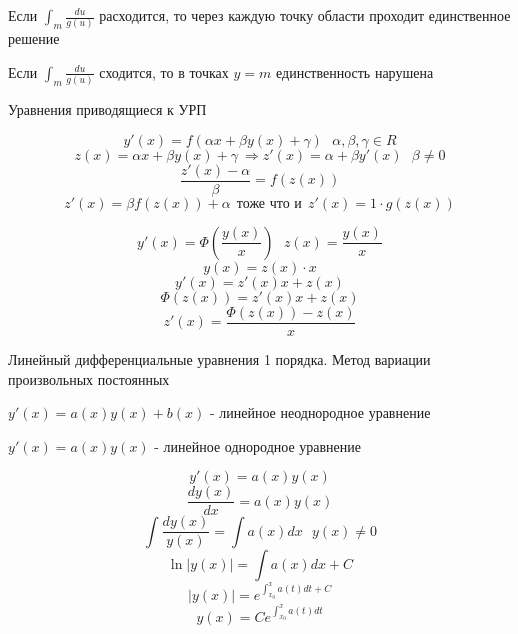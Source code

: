 \begin{theorem}
  Если $\int_m \frac{du}{g(u)}$ расходится, то через каждую точку области
  проходит единственное решение

  Если $\int_m \frac{du}{g(u)}$ сходится, то в точках $y = m$ единственность
  нарушена
\end{theorem}

\begin{title}[\Large]
  Уравнения приводящиеся к УРП
\end{title}

\begin{block}
  $$
  y'(x) = f(\alpha x + \beta y(x) + \gamma) ~~~ \alpha, \beta, \gamma \in R
  $$
  $$
  z(x) = \alpha x + \beta y(x) + \gamma ~ \Rightarrow z'(x) = \alpha +
  \beta y'(x) ~~~ \beta \not= 0
  $$
  $$
  \frac{z'(x) - \alpha}{\beta} = f(z(x))
  $$
  $$
  z'(x) = \beta f(z(x)) + \alpha ~~ \text{тоже что и} ~~
  z'(x) = 1 \cdot g(z(x))
  $$
\end{block}

\begin{block}
  $$
  y'(x) = \Phi \left( \frac{y(x)}{x} \right) ~~~ z(x) = \frac{y(x)}{x}
  $$
  $$
  y(x) = z(x) \cdot x
  $$
  $$
  y'(x) = z'(x) x + z(x)
  $$
  $$
  \Phi(z(x)) = z'(x)x + z(x)
  $$
  $$
  z'(x) = \frac{\Phi(z(x)) - z(x)}{x}
  $$
\end{block}

\begin{title}[\Large]
  Линейный дифференциальные уравнения 1 порядка. Метод вариации произвольных
  постоянных
\end{title}

\begin{define}
  $y'(x) = a(x)y(x) + b(x)$ - линейное неоднородное уравнение

  $y'(x) = a(x)y(x)$ - линейное однородное уравнение
\end{define}

\begin{block}
  $$
  y'(x) = a(x)y(x)
  $$
  $$
  \frac{dy(x)}{dx} = a(x)y(x)
  $$
  $$
  \int \frac{dy(x)}{y(x)} = \int a(x)dx ~~~ y(x) \not= 0
  $$
  $$
  \ln |y(x)| = \int a(x)dx + C
  $$
  $$
  |y(x)| = e^{\int_{x_0}^x a(t) dt + C}
  $$
  $$
  y(x) = C e^{\int_{x_0}^x a(t) dt}
  $$
\end{block}

